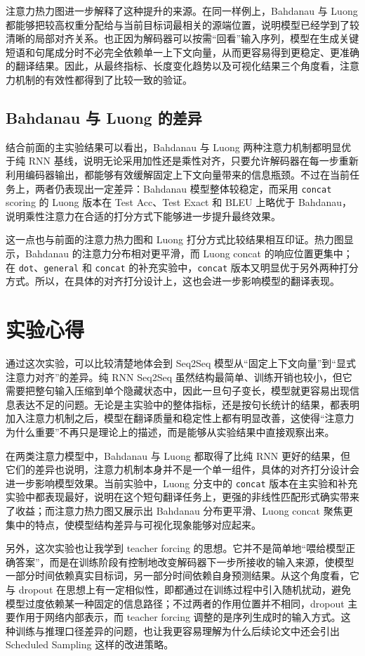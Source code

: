 \documentclass[a4paper]{article}
\begin{document}
注意力热力图进一步解释了这种提升的来源。在同一样例上，Bahdanau 与 Luong 都能够把较高权重分配给与当前目标词最相关的源端位置，说明模型已经学到了较清晰的局部对齐关系。也正因为解码器可以按需“回看”输入序列，模型在生成关键短语和句尾成分时不必完全依赖单一上下文向量，从而更容易得到更稳定、更准确的翻译结果。因此，从最终指标、长度变化趋势以及可视化结果三个角度看，注意力机制的有效性都得到了比较一致的验证。

\subsection{Bahdanau 与 Luong 的差异}
结合前面的主实验结果可以看出，Bahdanau 与 Luong 两种注意力机制都明显优于纯 RNN 基线，说明无论采用加性还是乘性对齐，只要允许解码器在每一步重新利用编码器输出，都能够有效缓解固定上下文向量带来的信息瓶颈。不过在当前任务上，两者仍表现出一定差异：Bahdanau 模型整体较稳定，而采用 \texttt{concat} scoring 的 Luong 版本在 Test Acc、Test Exact 和 BLEU 上略优于 Bahdanau，说明乘性注意力在合适的打分方式下能够进一步提升最终效果。

这一点也与前面的注意力热力图和 Luong 打分方式比较结果相互印证。热力图显示，Bahdanau 的注意力分布相对更平滑，而 Luong concat 的响应位置更集中；在 \texttt{dot}、\texttt{general} 和 \texttt{concat} 的补充实验中，\texttt{concat} 版本又明显优于另外两种打分方式。所以，在具体的对齐打分设计上，这也会进一步影响模型的翻译表现。

\section{实验心得}
通过这次实验，可以比较清楚地体会到 Seq2Seq 模型从“固定上下文向量”到“显式注意力对齐”的差异。纯 RNN Seq2Seq 虽然结构最简单、训练开销也较小，但它需要把整句输入压缩到单个隐藏状态中，因此一旦句子变长，模型就更容易出现信息表达不足的问题。无论是主实验中的整体指标，还是按句长统计的结果，都表明加入注意力机制之后，模型在翻译质量和稳定性上都有明显改善，这使得“注意力为什么重要”不再只是理论上的描述，而是能够从实验结果中直接观察出来。

在两类注意力模型中，Bahdanau 与 Luong 都取得了比纯 RNN 更好的结果，但它们的差异也说明，注意力机制本身并不是一个单一组件，具体的对齐打分设计会进一步影响模型效果。当前实验中，Luong 分支中的 \texttt{concat} 版本在主实验和补充实验中都表现最好，说明在这个短句翻译任务上，更强的非线性匹配形式确实带来了收益；而注意力热力图又展示出 Bahdanau 分布更平滑、Luong concat 聚焦更集中的特点，使模型结构差异与可视化现象能够对应起来。

另外，这次实验也让我学到 teacher forcing 的思想。它并不是简单地“喂给模型正确答案”，而是在训练阶段有控制地改变解码器下一步所接收的输入来源，使模型一部分时间依赖真实目标词，另一部分时间依赖自身预测结果。从这个角度看，它与 dropout 在思想上有一定相似性，即都通过在训练过程中引入随机扰动，避免模型过度依赖某一种固定的信息路径；不过两者的作用位置并不相同，dropout 主要作用于网络内部表示，而 teacher forcing 调整的是序列生成时的输入方式。这种训练与推理口径差异的问题，也让我更容易理解为什么后续论文中还会引出 Scheduled Sampling 这样的改进策略。
\end{document}
